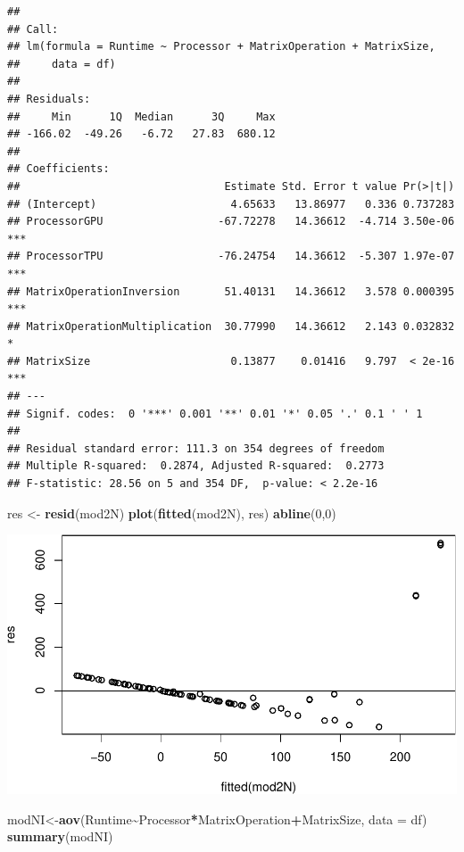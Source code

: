 \documentclass[
]{article}
\newenvironment{Shaded}{\begin{snugshade}}{\end{snugshade}}
\newcommand{\DataTypeTok}[1]{\textcolor[rgb]{0.13,0.29,0.53}{#1}}
\newcommand{\DecValTok}[1]{\textcolor[rgb]{0.00,0.00,0.81}{#1}}
\newcommand{\KeywordTok}[1]{\textcolor[rgb]{0.13,0.29,0.53}{\textbf{#1}}}
\newcommand{\NormalTok}[1]{#1}
\newcommand{\OperatorTok}[1]{\textcolor[rgb]{0.81,0.36,0.00}{\textbf{#1}}}
\newcommand{\StringTok}[1]{\textcolor[rgb]{0.31,0.60,0.02}{#1}}
\begin{document}
\begin{verbatim}
## 
## Call:
## lm(formula = Runtime ~ Processor + MatrixOperation + MatrixSize, 
##     data = df)
## 
## Residuals:
##     Min      1Q  Median      3Q     Max 
## -166.02  -49.26   -6.72   27.83  680.12 
## 
## Coefficients:
##                                Estimate Std. Error t value Pr(>|t|)    
## (Intercept)                     4.65633   13.86977   0.336 0.737283    
## ProcessorGPU                  -67.72278   14.36612  -4.714 3.50e-06 ***
## ProcessorTPU                  -76.24754   14.36612  -5.307 1.97e-07 ***
## MatrixOperationInversion       51.40131   14.36612   3.578 0.000395 ***
## MatrixOperationMultiplication  30.77990   14.36612   2.143 0.032832 *  
## MatrixSize                      0.13877    0.01416   9.797  < 2e-16 ***
## ---
## Signif. codes:  0 '***' 0.001 '**' 0.01 '*' 0.05 '.' 0.1 ' ' 1
## 
## Residual standard error: 111.3 on 354 degrees of freedom
## Multiple R-squared:  0.2874, Adjusted R-squared:  0.2773 
## F-statistic: 28.56 on 5 and 354 DF,  p-value: < 2.2e-16
\end{verbatim}

\begin{Shaded}
\begin{Highlighting}[]
\NormalTok{res \textless{}{-}}\StringTok{ }\KeywordTok{resid}\NormalTok{(mod2N)}
\KeywordTok{plot}\NormalTok{(}\KeywordTok{fitted}\NormalTok{(mod2N), res)}
\KeywordTok{abline}\NormalTok{(}\DecValTok{0}\NormalTok{,}\DecValTok{0}\NormalTok{)}
\end{Highlighting}
\end{Shaded}

\includegraphics{main_files/figure-latex/unnamed-chunk-27-2.pdf}

\begin{Shaded}
\begin{Highlighting}[]
\NormalTok{modNI\textless{}{-}}\KeywordTok{aov}\NormalTok{(Runtime}\OperatorTok{\textasciitilde{}}\NormalTok{Processor}\OperatorTok{*}\NormalTok{MatrixOperation}\OperatorTok{+}\NormalTok{MatrixSize, }\DataTypeTok{data =}\NormalTok{ df)}
\KeywordTok{summary}\NormalTok{(modNI)}
\end{Highlighting}
\end{Shaded}
\end{document}
